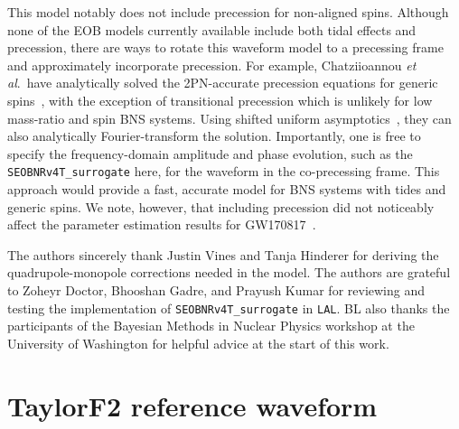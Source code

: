 \documentclass[prd,aps,letter,twocolumn,floatfix,notitlepage,nofootinbib]{revtex4-1}
\begin{document}
This model notably does not include precession for non-aligned spins. Although none of the EOB models currently available include both tidal effects and precession, there are ways to rotate this waveform model to a precessing frame and approximately incorporate precession. For example, Chatziioannou {\it et al}.\ have analytically solved the 2PN-accurate precession equations for generic spins~\cite{ChatziioannouKleinCornish2017a, ChatziioannouKleinCornish2017b}, with the exception of transitional precession which is unlikely for low mass-ratio and spin BNS systems. Using shifted uniform asymptotics~\cite{Klein:2014bua}, they can also analytically Fourier-transform the solution. Importantly, one is free to specify the frequency-domain amplitude and phase evolution, such as the \texttt{SEOBNRv4T\_surrogate} here, for the waveform in the co-precessing frame. This approach would provide a fast, accurate model for BNS systems with tides and generic spins. We note, however, that including precession did not noticeably affect the parameter estimation results for GW170817~\cite{BNSPE}.


\begin{acknowledgments}

The authors sincerely thank Justin Vines and Tanja Hinderer for deriving the quadrupole-monopole corrections needed in the model. The authors are grateful to Zoheyr Doctor, Bhooshan Gadre, and Prayush Kumar for reviewing and testing the implementation of \texttt{SEOBNRv4T\_surrogate} in \texttt{LAL}. BL also thanks the participants of the Bayesian Methods in Nuclear Physics workshop at the University of Washington for helpful advice at the start of this work.

\end{acknowledgments}

\appendix
\section{TaylorF2 reference waveform}
\label{sec:taylorf2}
\end{document}
